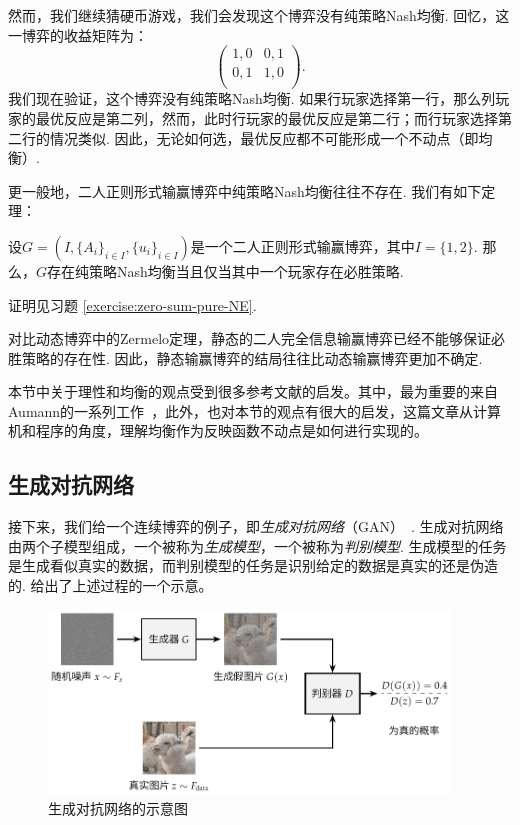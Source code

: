 然而，我们继续猜硬币游戏，我们会发现这个博弈没有纯策略Nash均衡. 回忆，这一博弈的收益矩阵为：
    \[
    \begin{pmatrix}
    1,0&0,1\\
    0,1&1,0\\
    \end{pmatrix}.
    \]
我们现在验证，这个博弈没有纯策略Nash均衡. 如果行玩家选择第一行，那么列玩家的最优反应是第二列，然而，此时行玩家的最优反应是第二行；而行玩家选择第二行的情况类似. 因此，无论如何选，最优反应都不可能形成一个不动点（即均衡）.

更一般地，二人正则形式输赢博弈中纯策略Nash均衡往往不存在. 我们有如下定理：
\begin{theorem}\label{thm:zero-sum-pure-NE}
设$G=(I,\{A_i\}_{i\in I}, \{u_i\}_{i\in I})$是一个二人正则形式输赢博弈，其中$I=\{1,2\}$. 那么，$G$存在纯策略Nash均衡当且仅当其中一个玩家存在必胜策略. %
\end{theorem}
证明见习题 \ref{exercise:zero-sum-pure-NE}.

对比动态博弈中的Zermelo定理，静态的二人完全信息输赢博弈已经不能够保证必胜策略的存在性. 因此，静态输赢博弈的结局往往比动态输赢博弈更加不确定.

\begin{remark}
    本节中关于理性和均衡的观点受到很多参考文献的启发。其中，最为重要的来自Aumann的一系列工作~\cite{aumannCorrelatedEquilibriumExpression1987,aumannEpistemicConditionsNash1995,aumannRationalityBoundedRationality1997,aumannWhatGameTheory1985}，此外，\cite{pavlovicSemanticalApproachEquilibria2009}也对本节的观点有很大的启发，这篇文章从计算机和程序的角度，理解均衡作为反映函数不动点是如何进行实现的。
\end{remark}

\subsection{生成对抗网络}

接下来，我们给一个连续博弈的例子，即\textit{生成对抗网络}（GAN）~\cite{goodfellowGenerativeAdversarialNets2014}. 生成对抗网络由两个子模型组成，一个被称为\textit{生成模型}，一个被称为\textit{判别模型}. 生成模型的任务是生成看似真实的数据，而判别模型的任务是识别给定的数据是真实的还是伪造的.  给出了上述过程的一个示意。

\begin{figure}[ht]
\centering
\includegraphics[width=0.95\textwidth]{figures/game/gan.pdf}
    \caption{生成对抗网络的示意图}
\label{fig:GAN}
\end{figure}

